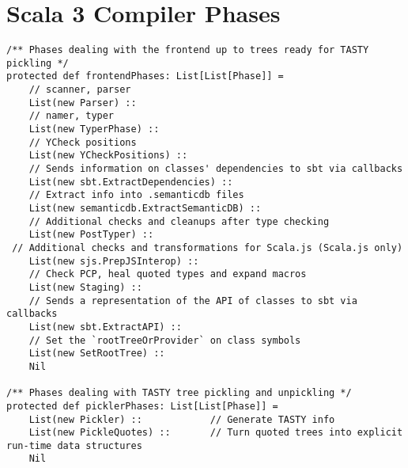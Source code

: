 \documentclass[letterpaper,12pt,titlepage,oneside,final]{book}
\begin{document}
\chapter{Scala 3 Compiler Phases}
\label{appendix:dotty-phases}
\begin{verbatim}
/** Phases dealing with the frontend up to trees ready for TASTY pickling */
protected def frontendPhases: List[List[Phase]] =
	// scanner, parser
	List(new Parser) ::     
	// namer, typer                  
	List(new TyperPhase) ::   
	// YCheck positions                
	List(new YCheckPositions) ::         
	// Sends information on classes' dependencies to sbt via callbacks 
	List(new sbt.ExtractDependencies) ::   
	// Extract info into .semanticdb files  
	List(new semanticdb.ExtractSemanticDB) :: 
	// Additional checks and cleanups after type checking
	List(new PostTyper) ::      
 // Additional checks and transformations for Scala.js (Scala.js only)              
	List(new sjs.PrepJSInterop) ::  
	// Check PCP, heal quoted types and expand macros         
	List(new Staging) ::      
	// Sends a representation of the API of classes to sbt via callbacks                
	List(new sbt.ExtractAPI) ::               
	// Set the `rootTreeOrProvider` on class symbols
	List(new SetRootTree) ::                  
	Nil

/** Phases dealing with TASTY tree pickling and unpickling */
protected def picklerPhases: List[List[Phase]] =
	List(new Pickler) ::            // Generate TASTY info
	List(new PickleQuotes) ::       // Turn quoted trees into explicit run-time data structures
	Nil


\end{verbatim}
\end{document}
